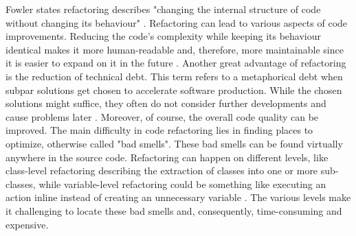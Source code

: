 Fowler states refactoring describes "changing the internal structure of code without changing its behaviour" \cite{fowler2018refactoring}.
Refactoring can lead to various aspects of code improvements. Reducing the code's complexity while keeping its behaviour identical makes it more human-readable and, therefore, more maintainable since it is easier to expand on it in the future \cite{kaur2016analysis}.
Another great advantage of refactoring is the reduction of technical debt. This term refers to a metaphorical debt when subpar solutions get chosen to accelerate software production. While the chosen solutions might suffice, they often do not consider further developments and cause problems later \cite{techdebt}.
Moreover, of course, the overall code quality can be improved.
The main difficulty in code refactoring lies in finding places to optimize, otherwise called "bad smells". These bad smells can be found virtually anywhere in the source code. Refactoring can happen on different levels, like class-level refactoring describing the extraction of classes into one or more sub-classes, while variable-level refactoring could be something like executing an action inline instead of creating an unnecessary variable \cite{aniche2020effectiveness}. The various levels make it challenging to locate these bad smells and, consequently, time-consuming and expensive.